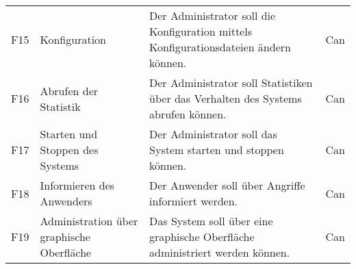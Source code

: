 \documentclass[../review_1.tex]{subfiles}
\begin{document}
\begin{longtable} [h] {p{1cm} p{4cm} p{7cm} l}
    F15                                                                                                                                                                                                              & Konfiguration                                  & Der Administrator soll die Konfiguration mittels Konfigurationsdateien ändern können.                                                                                                                                                                   & Can             \\
    F16                                                                                                                                                                                                              & Abrufen der Statistik                          & Der Administrator soll Statistiken über das Verhalten des Systems abrufen können.                                                                                                                                                                       & Can             \\
    F17                                                                                                                                                                                                              & Starten und Stoppen des Systems                & Der Administrator soll das System starten und stoppen können.                                                                                                                                                                                           & Can             \\
    F18                                                                                                                                                                                                              & Informieren des Anwenders                      & Der Anwender soll über Angriffe informiert werden.                                                                                                                                                                                                      & Can             \\
    F19                                                                                                                                                                                                              & Administration über graphische Oberfläche      & Das System soll über eine graphische Oberfläche administriert werden können.                                                                                                                                                                            & Can             \\

\end{longtable}
\end{document}
